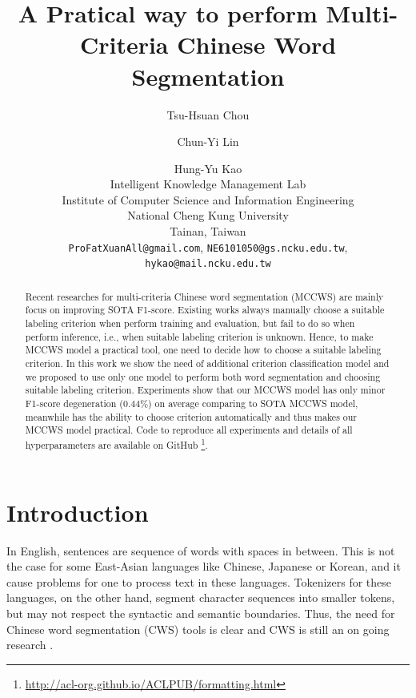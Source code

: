 \documentclass[11pt]{article}
\title{A Pratical way to perform Multi-Criteria Chinese Word Segmentation}
\author{Tsu-Hsuan Chou \and Chun-Yi Lin \and Hung-Yu Kao \\
Intelligent Knowledge Management Lab \\
Institute of Computer Science and Information Engineering \\
National Cheng Kung University \\
Tainan, Taiwan \\
  \texttt{ProFatXuanAll@gmail.com}, \texttt{NE6101050@gs.ncku.edu.tw}, \\
  \texttt{hykao@mail.ncku.edu.tw}
}
\begin{document}
\maketitle
\begin{abstract}
  Recent researches for multi-criteria Chinese word segmentation (MCCWS) are mainly focus on improving SOTA F1-score.
  Existing works always manually choose a suitable labeling criterion when perform training and evaluation, but fail to do so when perform inference, i.e., when suitable labeling criterion is unknown.
  Hence, to make MCCWS model a practical tool, one need to decide how to choose a suitable labeling criterion.
  In this work we show the need of additional criterion classification model and we proposed to use only one model to perform both word segmentation and choosing suitable labeling criterion.
  Experiments show that our MCCWS model has only minor F1-score degeneration (\(0.44\%\)) on average comparing to SOTA MCCWS model, meanwhile has the ability to choose criterion automatically and thus makes our MCCWS model practical.
  Code to reproduce all experiments and details of all hyperparameters are available on GitHub \footnote{\url{http://acl-org.github.io/ACLPUB/formatting.html}}.
\end{abstract}

\section{Introduction}

In English, sentences are sequence of words with spaces in between.
This is not the case for some East-Asian languages like Chinese, Japanese or Korean, and it cause problems for one to process text in these languages.
Tokenizers for these languages, on the other hand, segment character sequences into smaller tokens, but may not respect the syntactic and semantic boundaries.
Thus, the need for Chinese word segmentation (CWS) tools is clear and CWS is still an on going research \citep{chen-etal-2017-adversarial,ma-etal-2018-state,He-2019-effective,Gong-2019-switch,huang-etal-2020-towards,huang-etal-2020-joint-multiple,ke2020unified,qiu-etal-2020-concise,ke-etal-2021-pre,tong-etal-2022-word}.
\end{document}
